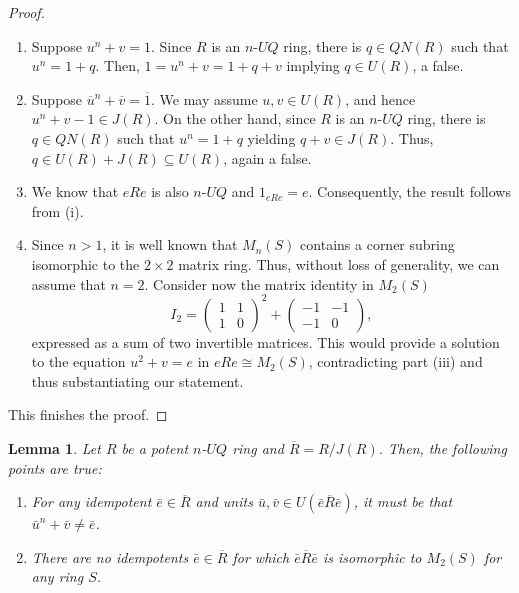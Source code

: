 \documentclass[10pt,a4paper]{amsart}
\newtheorem{lemma}[theorem]{Lemma}
\begin{document}
\begin{proof}
\begin{enumerate}
\item
Suppose $u^n + v = 1$. Since $R$ is an $n$-$UQ$ ring, there is $q \in QN(R)$ such that $u^n = 1 + q$. Then, $1 = u^n + v = 1 + q + v$ implying $q\in U(R)$, a false.
\item	
Suppose $\overline{u}^n + \overline{v} = \overline{1}$. We may assume $u, v \in U(R)$, and hence $u^n + v - 1 \in J(R)$. On the other hand, since $R$ is an $n$-$UQ$ ring, there is $q \in QN(R)$ such that $u^n = 1 + q$ yielding $q + v \in J(R)$. Thus, $q \in U(R) + J(R) \subseteq U(R)$, again a false.
\item	
We know that $eRe$ is also $n$-$UQ$ and $1_{eRe}=e$. Consequently, the result follows from (i).
\item	
Since $n>1$, it is well known that $M_n(S)$ contains a corner subring isomorphic to the $2 \times 2$ matrix ring.%
Thus, without loss of generality, we can assume that $n=2$. Consider now the matrix identity in $M_2(S)$
	\[
	I_2 = \begin{pmatrix} 1 & 1 \\ 1 & 0 \end{pmatrix}^2 + \begin{pmatrix} -1 & -1 \\ -1 & 0 \end{pmatrix},
	\]
expressed as a sum of two invertible matrices. This would provide a solution to the equation $u^2 + v = e$ in $eRe \cong M_2(S)$, contradicting part (iii) and thus substantiating our statement.
\end{enumerate}

This finishes the proof.
\end{proof}

\begin{lemma}\label{exe}
Let $R$ be a potent $n$-$UQ$ ring and $\overline{R} = R/J(R)$. Then, the following points are true:
\begin{enumerate}
\item
For any idempotent $\bar{e} \in \overline{R}$ and units $\bar{u}, \bar{v} \in U(\bar{e}\overline{R}\bar{e})$, it must be that $\bar{u}^n + \bar{v} \neq \bar{e}$.
\item	
There are no idempotents $\bar{e} \in \overline{R}$ for which $\bar{e}\overline{R}\bar{e}$ is isomorphic to $M_2(S)$ for any ring $S$.
\end{enumerate}
\end{lemma}
\end{document}
